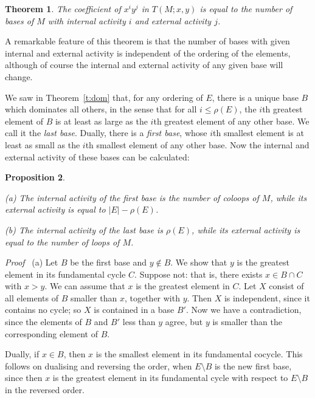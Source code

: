\documentclass[12pt]{article}
\newtheorem{theorem}{Theorem}[section]
\newtheorem{proposition}[theorem]{Proposition}
\newcommand{\head}[1]{\medbreak\noindent\textit{#1}\ }
\begin{document}
\begin{theorem}
The coefficient of $x^iy^j$ in $T(M;x,y)$ is equal to the number of bases
of $M$ with internal activity $i$ and external activity $j$.
\end{theorem}

A remarkable feature of this theorem is that the number of bases with
given internal and external activity is independent of the ordering
of the elements, although of course the internal and external activity
of any given base will change.

We saw in Theorem~\ref{t:dom} that, for any ordering of $E$,
there is a unique base $B$ which dominates
all others, in the sense that for all $i\le \rho(E)$, the $i$th greatest
element of $B$ is at least as large as the $i$th greatest element of any
other base. We call it the \textit{last base}. Dually, there is a
\textit{first base}, whose $i$th smallest element is at least as small
as the $i$th smallest element of any other base. Now the internal and
external activity of these bases can be calculated:

\begin{proposition}
\begin{description}
\item{(a)} The internal activity of the first base is the number of coloops
of $M$, while its external activity is equal to $|E|-\rho(E)$.
\item{(b)} The internal activity of the last base is $\rho(E)$, while its
external activity is equal to the number of loops of $M$.
\end{description}
\end{proposition}

\head{Proof} (a) Let $B$ be the first base and $y\notin B$. We show that
$y$ is the greatest element in its fundamental cycle $C$. Suppose not:
that is, there exists $x\in B\cap C$ with $x>y$. We can assume that $x$
is the greatest element in $C$. Let $X$ consist of all elements of $B$
smaller than $x$, together with $y$. Then $X$ is independent, since it
contains no cycle; so $X$ is contained in a base $B'$. Now we have a
contradiction, since the elements of $B$ and $B'$ less than $y$ agree,
but $y$ is smaller than the corresponding element of $B$.

Dually, if $x\in B$, then $x$ is the smallest element in its  fundamental
cocycle. This follows on dualising and reversing the order, when
$E\setminus B$ is the new first base, since then $x$ is the greatest
element in its fundamental cycle with respect to $E\setminus B$ in the
reversed order.
\end{document}
